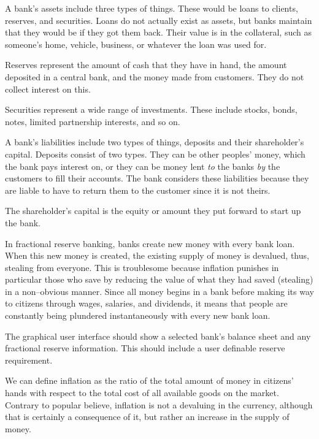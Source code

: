 \crlf
{}
\startformula
{}
\stopformula
\crlf

A bank's assets include three types of things. These would be loans to clients, reserves, and securities. Loans do not actually exist as assets, but banks maintain that they would be if they got them back. Their value is in the collateral, such as someone's home, vehicle, business, or whatever the loan was used for.

Reserves represent the amount of cash that they have in hand, the amount deposited in a central bank, and the money made from customers. They do not collect interest on this. 

Securities represent a wide range of investments. These include stocks, bonds, notes, limited partnership interests, and so on.

A bank's liabilities include two types of things, deposits and their shareholder's capital. Deposits consist of two types. They can be other peoples' money, which the bank pays interest on, or they can be money lent {\it to} the banks {\it by} the customers to fill their accounts. The bank considers these liabilities because they are liable to have to return them to the customer since it is not theirs.

The shareholder's capital is the equity or amount they put forward to start up the bank.

In fractional reserve banking, banks create new money with every bank loan. When this new money is created, the existing supply of money is devalued, thus, stealing from everyone. This is troublesome because inflation punishes in particular those who save by reducing the value of what they had saved (stealing) in a non--obvious manner. Since all money begins in a bank before making its way to citizens through wages, salaries, and dividends, it means that people are constantly being plundered instantaneously with every new bank loan.

The graphical user interface should show a selected bank's balance sheet and any fractional reserve information. This should include a user definable reserve requirement.

We can define inflation as the ratio of the total amount of money in citizens' hands with respect to the total cost of all available goods on the market. Contrary to popular believe, inflation is not a devaluing in the currency, although that is certainly a consequence of it, but rather an increase in the supply of money. 

